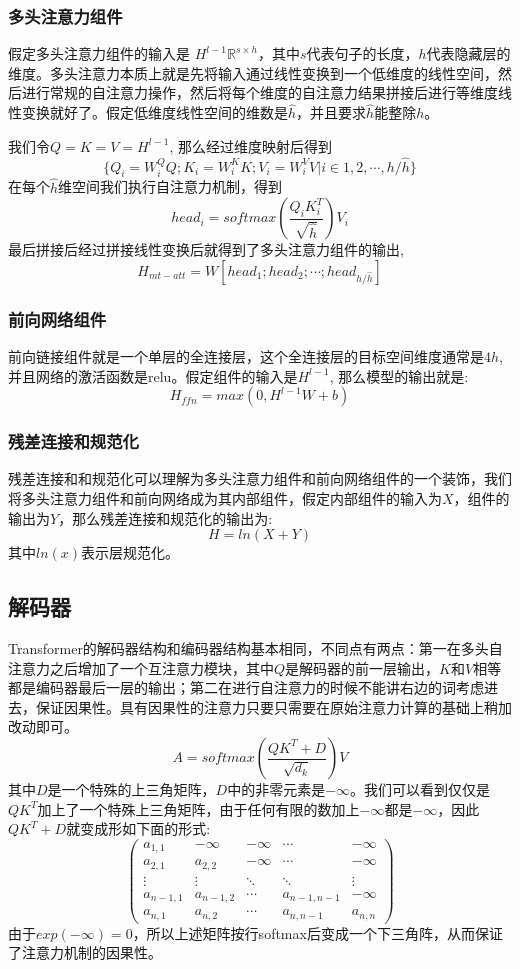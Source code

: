 \documentclass[twoside,a4paper,12pt]{book}%
\begin{document}
\subsubsection{多头注意力组件}
假定多头注意力组件的输入是
$H^{l-1}\mathbb{R}^{s \times h}$，其中$s$代表句子的长度，$h$代表隐藏层的维度。多头注意力本质上就是先将输入通过线性变换到一个低维度的线性空间，然后进行常规的自注意力操作，然后将每个维度的自注意力结果拼接后进行等维度线性变换就好了。假定低维度线性空间的维数是$\hat{h}$，并且要求$\hat{h}$能整除$h$。

我们令$Q=K=V=H^{l-1}$, 那么经过维度映射后得到
$$
\{Q_i=W_i^{Q}Q;K_i=W_i^{K}K;V_i=W_i^{V}V |i \in 1,2,\cdots,h/\hat{h}\}
$$
在每个$\hat{h}$维空间我们执行自注意力机制，得到
$$
head_i=softmax(\frac{Q_i K_i^T}{\sqrt{\hat{h}}})V_i
$$
最后拼接后经过拼接线性变换后就得到了多头注意力组件的输出,
$$
H_{mt-att}= W[head_1;head_2;\cdots ;head_{h/\hat{h}}]
$$
\subsubsection{前向网络组件}
前向链接组件就是一个单层的全连接层，这个全连接层的目标空间维度通常是$4h$, 并且网络的激活函数是relu。假定组件的输入是$H^{l-1}$, 那么模型的输出就是:
$$
H_{ffn}=max(0, H^{l-1}W+b)
$$
\subsubsection{残差连接和规范化}
残差连接和和规范化可以理解为多头注意力组件和前向网络组件的一个装饰，我们将多头注意力组件和前向网络成为其内部组件，假定内部组件的输入为$X$，组件的输出为$Y$，那么残差连接和规范化的输出为:
$$
H = ln(X + Y)
$$
其中$ln(x)$表示层规范化。
\subsection{解码器}
Transformer的解码器结构和编码器结构基本相同，不同点有两点：第一在多头自注意力之后增加了一个互注意力模块，其中$Q$是解码器的前一层输出，$K$和$V$相等都是编码器最后一层的输出；第二在进行自注意力的时候不能讲右边的词考虑进去，保证因果性。具有因果性的注意力只要只需要在原始注意力计算的基础上稍加改动即可。
$$
A=softmax(\frac{Q K^T + D}{\sqrt{d_k}})V
$$
其中$D$是一个特殊的上三角矩阵，$D$中的非零元素是$-\infty$。我们可以看到仅仅是$QK^T$加上了一个特殊上三角矩阵，由于任何有限的数加上$-\infty$都是$-\infty$，因此$QK^T+D$就变成形如下面的形式:
$$
\begin{pmatrix}
a_{1,1} & -\infty & -\infty & \cdots & -\infty \\
a_{2,1} & a_{2,2}   & -\infty & \cdots & -\infty\\
\vdots  & \vdots    &\ddots & \ddots & \vdots\\
a_{n-1,1} & a_{n-1,2}   &\cdots & a_{n-1,n-1} & -\infty\\
a_{n,1} & a_{n,2}   &\cdots & a_{n,n-1} & a_{n,n}
\end{pmatrix}
$$
由于$exp(-\infty)=0$，所以上述矩阵按行softmax后变成一个下三角阵，从而保证了注意力机制的因果性。
\end{document}
